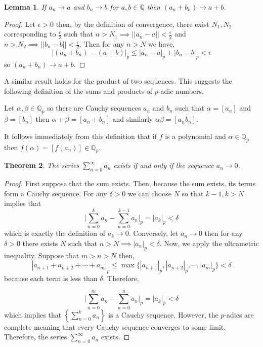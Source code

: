 \documentclass{article}
\newcommand{\Q}{\mathbb{Q}}
\newenvironment{definition}[1][Definition:]{\begin{trivlist}
\item[\hskip \labelsep {\bfseries #1}]}{\end{trivlist}}
\theoremstyle{theorem}
\newtheorem{theorem}{Theorem}[section]
\newtheorem{lemma}[theorem]{Lemma}
\theoremstyle{definition}
\theoremstyle{definition}
\theoremstyle{remark}
\theoremstyle{definition}
\theoremstyle{remark}
\begin{document}
\begin{lemma}
If $a_n \to a$ and $b_n \to b$ for $a, b \in \Q$ then $(a_n + b_n) \to a + b$. 
\end{lemma}

\begin{proof}
Let $\epsilon > 0$ then, by the definition of convergence, there exist $N_1, N_2$ corresponding to $\frac{\epsilon}{2}$ such that $n > N_1 \implies ||a_n - a|| < \frac{\epsilon}{2}$ and $n > N_2 \implies ||b_n - b|| < \frac{\epsilon}{2}$. Then for any $n > N$ we have, 
\[|(a_n + b_n) - (a + b)|_p \le |a_n - a|_p + |b_n - b|_p < \epsilon\] so $(a_n + b_n) \to a + b$. 
\end{proof}

A similar result holds for the product of two sequences. This suggests the following definition of the sums and products of $p$-adic numbers. 

\begin{definition}
Let $\alpha, \beta \in \Q_p$ so there are Cauchy sequences $a_n$ and $b_n$ such that $\alpha = [a_n]$ and $\beta = [b_n]$ then $\alpha + \beta = [a_n + b_n]$ and similarly $\alpha \beta = [a_n b_n]$.
\end{definition}

It follows immediately from this definition that if $f$ is a polynomial and $\alpha \in \Q_p$ then $f(\alpha) = [f(a_n)] \in \Q_p$.  

\begin{theorem}
The series $\sum\limits_{n = 0}^\infty a_n$ exists if and only if the sequence $a_n \to 0$.
\end{theorem}

\begin{proof}
First suppose that the sum exists. Then, because the sum exists, its terms form a Cauchy sequence. For any $\delta > 0$ we can choose $N$ so that $k - 1, k  > N$ implies that 
\[ \bigg|\sum\limits_{n = 0}^{k} a_n - \sum\limits_{n = 0}^{k-1} a_n \bigg|_p = |a_{k}|_p < \delta \]
which is exactly the definition of $a_k \to 0$. Conversely, let $a_n \to 0$ then for any $\delta > 0$ there exists $N$ such that $n > N \implies |a_n|_p < \delta$. Now, we apply the ultrametric inequality. Suppose that $m > n > N$ then, 
\[|a_{n+1} + a_{n+2} + \cdots + a_{m}|_p \le \max\{|a_{n+1}|_p, |a_{n+2}|_p, \cdots, |a_m|_p \} < \delta\]
because each term is less than $\delta$. Therefore,

\[ \bigg|\sum\limits_{n = 0}^{m} a_n - \sum\limits_{n = 0}^{n} a_n \bigg|_p = |a_{k}|_p < \delta \] 
which implies that $\left\{  \sum\limits_{n = 0}^{k} a_n \right\}$ is a Cauchy sequence. However, the $p$-adics are complete meaning that every Cauchy sequence converges to some limit. Therefore, the series $\sum\limits_{n = 0}^{\infty} a_n$ exists. 
\end{proof}
\end{document}
